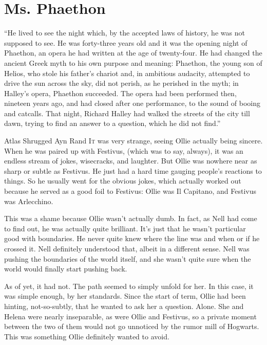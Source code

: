 \chapter{Ms. Phaethon}

“He lived to see the night which, by the accepted laws of history, he was not supposed to see. He was forty-three years old and it was the opening night of Phaethon, an opera he had written at the age of twenty-four. He had changed the ancient Greek myth to his own purpose and meaning: Phaethon, the young son of Helios, who stole his father’s chariot and, in ambitious audacity, attempted to drive the sun across the sky, did not perish, as he perished in the myth; in Halley’s opera, Phaethon succeeded. The opera had been performed then, nineteen years ago, and had closed after one performance, to the sound of booing and catcalls. That night, Richard Halley had walked the streets of the city till dawn, trying to find an answer to a question, which he did not find.”

Atlas Shrugged
Ayn Rand
\simpleline
{}
\lettrine{I}{t} was very strange, seeing Ollie actually being sincere. When he was paired up with Festivus, (which was to say, always), it was an endless stream of jokes, wisecracks, and laughter. But Ollie was nowhere near as sharp or subtle as Festivus. He just had a hard time gauging people’s reactions to things. So he usually went for the obvious jokes, which actually worked out because he served as a good foil to Festivus: Ollie was Il Capitano, and Festivus was Arlecchino.

This was a shame because Ollie wasn’t actually dumb. In fact, as Nell had come to find out, he was actually quite brilliant. It’s just that he wasn’t particular good with boundaries. He never quite knew where the line was and when or if he crossed it. Nell definitely understood that, albeit in a different sense. Nell was pushing the boundaries of the world itself, and she wasn’t quite sure when the world would finally start pushing back.

As of yet, it had not. The path seemed to simply unfold for her. In this case, it was simple enough, by her standards. Since the start of term, Ollie had been hinting, not-so-subtly, that he wanted to ask her a question. Alone. She and Helena were nearly inseparable, as were Ollie and Festivus, so a private moment between the two of them would not go unnoticed by the rumor mill of Hogwarts. This was something Ollie definitely wanted to avoid.

